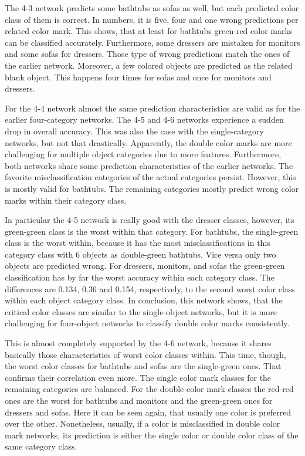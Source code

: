 The 4-3 network predicts some bathtubs as sofas as well, but each predicted color class of them is correct.
In numbers, it is five, four and one wrong predictions per related color mark.
This shows, that at least for bathtubs green-red color marks can be classified accurately.
Furthermore, some dressers are mistaken for monitors and some sofas for dressers.
Those type of wrong predictions match the ones of the earlier network.
Moreover, a few colored objects are predicted as the related blank object.
This happens four times for sofas and once for monitors and dressers.

For the 4-4 network almost the same prediction characteristics are valid as for the earlier four-category networks.
The 4-5 and 4-6 networks experience a sudden drop in overall accuracy.
This was also the case with the single-category networks, but not that drastically.
Apparently, the double color marks are more challenging for multiple object categories due to more features.
Furthermore, both networks share some prediction characteristics of the earlier networks.
The favorite misclassification categories of the actual categories persist.
However, this is mostly valid for bathtubs.
The remaining categories mostly predict wrong color marks within their category class.

In particular the 4-5 network is really good with the dresser classes, however, its green-green class is the worst within that category.
For bathtubs, the single-green class is the worst within, because it has the most misclassifications in this category class with 6 objects as double-green bathtubs.
Vice versa only two objects are predicted wrong.
For dressers, monitors, and sofas the green-green classification has by far the worst accuracy within each category class.
The differences are 0.134, 0.36 and 0.154, respectively, to the second worst color class within each object category class.
In conclusion, this network shows, that the critical color classes are similar to the single-object networks, but it is more challenging for four-object networks to classify double color marks consistently.

This is almost completely supported by the 4-6 network, because it shares basically those characteristics of worst color classes within.
This time, though, the worst color classes for bathtubs and sofas are the single-green ones.
That confirms their correlation even more.
The single color mark classes for the remaining categories are balanced.
For the double color mark classes the red-red ones are the worst for bathtubs and monitors and the green-green ones for dressers and sofas.
Here it can be seen again, that usually one color is preferred over the other.
Nonetheless, usually, if a color is misclassified in double color mark networks, its prediction is either the single color or double color class of the same category class.


